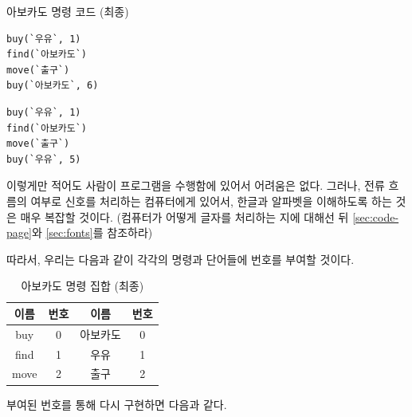 \documentclass{article}
\begin{document}
\begin{center}

    \centering

    아보카도 명령 코드 (최종)

    \begin{minipage}{0.45\textwidth}
        \begin{lstlisting}[escapeinside=``]
buy(`우유`, 1)
find(`아보카도`)
move(`출구`)
buy(`아보카도`, 6)
        \end{lstlisting}
    \end{minipage}
    \hfill
    \begin{minipage}{0.45\textwidth}
        \begin{lstlisting}[escapeinside=``]
buy(`우유`, 1)
find(`아보카도`)
move(`출구`)
buy(`우유`, 5)
        \end{lstlisting}
    \end{minipage}

\end{center}

이렇게만 적어도 사람이 프로그램을 수행함에 있어서 어려움은 없다.
그러나, 전류 흐름의 여부로 신호를 처리하는 컴퓨터에게 있어서,
한글과 알파벳을 이해하도록 하는 것은 매우 복잡할 것이다.
(컴퓨터가 어떻게 글자를 처리하는 지에 대해선 뒤
\autoref{sec:code-page}와 \autoref{sec:fonts}를 참조하라)

따라서, 우리는 다음과 같이 각각의 명령과 단어들에 번호를 부여할 것이다.

\begin{table}[!h]
    \centering

    \caption{아보카도 명령 집합 (최종)}
    \label{Tab:avocado-isa-int}

    \begin{tabular}{ || c | c | c | c || }
        \hline
        이름 & 번호 & 이름     & 번호 \\
        \hline\hline
        buy  & 0    & 아보카도 & 0    \\
        \hline
        find & 1    & 우유     & 1    \\
        \hline
        move & 2    & 출구     & 2    \\
        \hline
    \end{tabular}
\end{table}

부여된 번호를 통해 다시 구현하면 다음과 같다.
\end{document}
